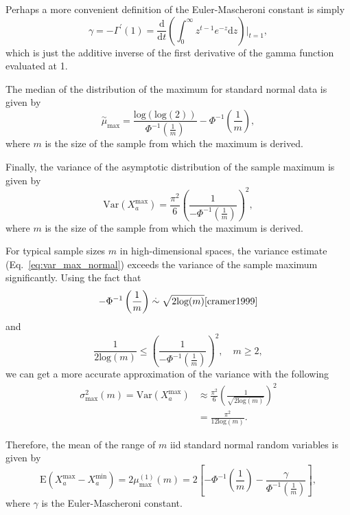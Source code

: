 \documentclass[10pt,letterpaper]{article}
\begin{document}
Perhaps a more convenient definition of the Euler-Mascheroni constant is simply
%
\[
\gamma = - \Gamma^\prime (1) = \frac{\text{d}}{\text{d}t} \left(\int^{\infty}_{0} z^{t-1} e^{-z} \text{d}z\right) \biggr|_{t=1},
\]
%
which is just the additive inverse of the first derivative of the gamma function evaluated at 1.

The median of the distribution of the maximum for standard normal data is given by
%
\begin{equation}\label{eq:med_max_normal}
\overset{\sim}{\mu}_\text{max} = \frac{\text{log}(\text{log}(2))}{\Phi^{-1}\left(\frac{1}{m}\right)} - \Phi^{-1}\left(\frac{1}{m}\right),
\end{equation}
%
where $m$ is the size of the sample from which the maximum is derived.

Finally, the variance of the asymptotic distribution of the sample maximum is given by
%
\begin{equation}\label{eq:var_max_normal}
\text{Var}(X^\text{max}_a) = \frac{\pi^2}{6}\left(\frac{1}{-\Phi^{-1}\left(\frac{1}{m}\right)}\right)^2,
\end{equation}
%
where $m$ is the size of the sample from which the maximum is derived.

For typical sample sizes $m$ in high-dimensional spaces, the variance estimate (Eq.~\ref{eq:var_max_normal}) exceeds the variance of the sample maximum significantly. Using the fact that
%
\[
-\Phi^{-1}\left(\frac{1}{m}\right) \overset{.}{\sim} \sqrt{2 \text{log}(m)} \text{\cite{cramer1999}}
\] 
%
and 
%
\[
\frac{1}{2 \text{log}(m)} \leq \left(\frac{1}{-\Phi^{-1}\left(\frac{1}{m}\right)}\right)^2, \quad m \geq 2,
\] 
%
we can get a more accurate approximation of the variance with the following
%
\begin{equation}\label{eq:var_max_normal_improved}
\begin{aligned}
\sigma^2_\text{max}(m) = \text{Var}(X^\text{max}_a) &\approx \frac{\pi^2}{6}\left(\frac{1}{\sqrt{2\text{log}(m)}}\right)^2 \\
&= \frac{\pi^2}{12\text{log}(m)}.
\end{aligned}
\end{equation}

Therefore, the mean of the range of $m$ iid standard normal random variables is given by
%
\begin{equation}\label{eq:mu_rng_normal}
\text{E}(X^\text{max}_a - X^\text{min}_a) = 2\mu^{(1)}_\text{max}(m) = 2\left[-\Phi^{-1} \left(\frac{1}{m}\right) - \frac{\gamma}{\Phi^{-1}\left(\frac{1}{m}\right)}\right],
\end{equation}
%
where $\gamma$ is the Euler-Mascheroni constant.
\end{document}
